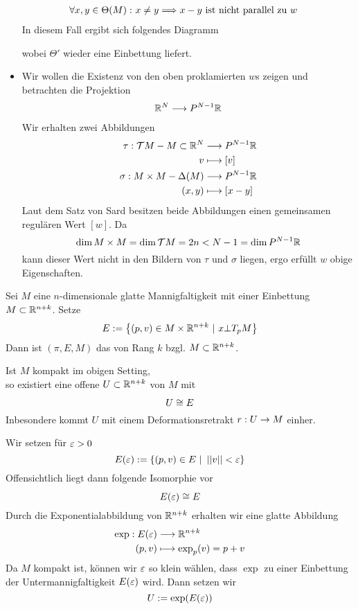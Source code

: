 \begin{Beweis}{}
\begin{itemize}
\begin{align*}
	\forall x,y \in \Theta(M):~& x\neq y \overset{}{\Longrightarrow} x-y \text{ ist nicht parallel zu } w
	\end{align*}
	In diesem Fall ergibt sich folgendes Diagramm
	\begin{center}
	\end{center}
wobei $\Theta'$ wieder eine Einbettung liefert.
\item Wir wollen die Existenz von den oben proklamierten $w$s zeigen und betrachten die Projektion
\begin{align*}
\mathbb{R}^N \overset{}{\longrightarrow} P^{N-1}\mathbb{R}
\end{align*}
Wir erhalten zwei Abbildungen
\begin{align*}
\tau : \mathcal{T} M - M \subset \mathbb{R}^N & \overset{}{\longrightarrow} P^{N-1}\mathbb{R}\\
v & \longmapsto [v]\\
\sigma : M\times M - \Delta(M) & \overset{}{\longrightarrow} P^{N-1}\mathbb{R}\\
(x,y) & \longmapsto [x-y]
\end{align*}
Laut dem Satz von Sard besitzen beide Abbildungen einen gemeinsamen regulären Wert $[w]$. Da
\[ \dim M\times M= \dim \mathcal{T} M = 2n< N-1 = \dim P^{N-1}\mathbb{R} \]
kann dieser Wert nicht in den Bildern von $\tau$ und $\sigma$ liegen, ergo erfüllt $w$ obige Eigenschaften.
\end{itemize}
\end{Beweis}

\Def{}
Sei $M$ eine $n$-dimensionale glatte Mannigfaltigkeit mit einer Einbettung $M \subset \mathbb{R}^{n+k}$. Setze
\[ E:= \set{ (p,v) \in M\times \R^{n+k} }{ x\bot T_pM } \]
Dann ist $(\pi, E, M)$ das  von Rang $k$ bzgl. $M \subset \mathbb{R}^{n+k}$.

Ist $M$ kompakt im obigen Setting,\\
so existiert eine offene  $U\subset \mathbb{R}^{n+k}$ von $M$ mit
\[ U \overset{}{\cong} E \]
Inbesondere kommt $U$ mit einem Deformationsretrakt $r : U \overset{}{\rightarrow} M$ einher.
\begin{Beweis}{}
Wir setzen für $\varepsilon > 0$
\[ E(\e) := \set{(p,v) \in E}{\norm{v}< \epsilon} \]
Offensichtlich liegt dann folgende Isomorphie vor
\[ E(\varepsilon) \overset{}{\cong} E \]
Durch die Exponentialabbildung von $\mathbb{R}^{n+k}$ erhalten wir eine glatte Abbildung
\begin{align*}
\exp : E(\varepsilon) & \overset{}{\longrightarrow} \mathbb{R}^{n+k}\\
(p,v) & \longmapsto \exp_p(v) = p +v 
\end{align*}
Da $M$ kompakt ist, können wir $\varepsilon$ so klein wählen, dass $\exp$ zu einer Einbettung der Untermannigfaltigkeit $E(\varepsilon)$ wird. Dann setzen wir
\[ U:= \exp(E(\varepsilon)) \]
\end{Beweis}